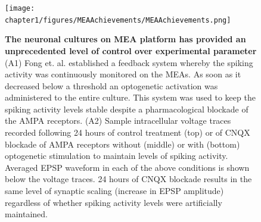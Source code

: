     \begin{figure}[!htb]
        \centering
        \texttt{[image: chapter1/figures/MEAAchievements/MEAAchievements.png]}
        \caption[Examples studies demonstrating the utility of neuronal culture based research system]{\textbf{The neuronal cultures on MEA platform has provided an unprecedented level of control over experimental parameter} (A1) Fong et. al. established a feedback system whereby the spiking activity was continuously monitored on the MEAs. As soon as it decreased below a threshold an optogenetic activation was administered to the entire culture. This system was used to keep the spiking activity levels stable despite a pharmacological blockade of the AMPA receptors. (A2) Sample intracellular voltage traces recorded following 24 hours of control treatment (top) or of CNQX blockade of AMPA receptors without (middle) or with (bottom) optogenetic stimulation to maintain levels of spiking activity. Averaged EPSP waveform in each of the above conditions is shown below the voltage traces. 24 hours of CNQX blockade results in the same level of synaptic scaling (increase in EPSP amplitude) regardless of whether spiking activity levels were artificially maintained.}
         

    \end{figure}
    \clearpage


